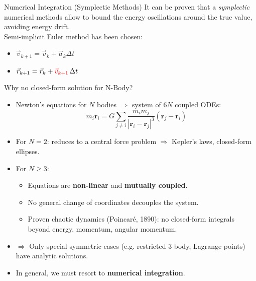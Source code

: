 \documentclass{beamer}
\begin{document}
\begin{frame}{Numerical Integration (Symplectic Methods)}
It can be proven that a \emph{symplectic} numerical methods allow to bound the energy oscillations around the true value, avoiding energy drift.  %
\\[2ex]
Semi-implicit Euler method has been chosen:
\begin{itemize}
	\item $\vec{v}_{k+1}=\vec{v}_k+\vec{a}_k\Delta t $
	\item $\vec{r}_{k+1}=\vec{r}_k+\textcolor{red}{\vec{v}_{k+1}} \, \Delta t$
\end{itemize}
\end{frame}
 \begin{frame}{Why no closed-form solution for N-Body?}
\begin{itemize}
    \item Newton’s equations for $N$ bodies $\Rightarrow$ system of $6N$ coupled ODEs:
    \[
        m_i \ddot{\mathbf{r}}_i = G \sum_{j \neq i} \frac{m_i m_j}{|\mathbf{r}_i - \mathbf{r}_j|^3} (\mathbf{r}_j - \mathbf{r}_i)
    \]
    \item For $N=2$: reduces to a central force problem $\Rightarrow$ Kepler’s laws, closed-form ellipses.  
    \item For $N \geq 3$:  
        \begin{itemize}
            \item Equations are \textbf{non-linear} and \textbf{mutually coupled}.  
            \item No general change of coordinates decouples the system.  
            \item Proven chaotic dynamics (Poincaré, 1890): no closed-form integrals beyond energy, momentum, angular momentum.  
        \end{itemize}
    \item $\Rightarrow$ Only special symmetric cases (e.g. restricted 3-body, Lagrange points) have analytic solutions.  
    \item In general, we must resort to \textbf{numerical integration}.  
\end{itemize}
\end{frame}



\end{document}
